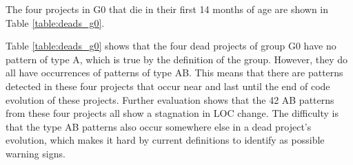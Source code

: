 \noindent
The four projects in G0 that die in their first 14 months of age are shown in
Table \ref{table:deads_g0}.



\noindent
Table \ref{table:deads_g0} shows that the four dead projects of group G0 have
no pattern of type A, which is true by the definition of the group. However,
they do all have occurrences of patterns of type AB. This means that there are
patterns detected in these four projects that occur near and last until the end
of code evolution of these projects. Further evaluation shows that the 42 AB
patterns from these four projects all show a stagnation in LOC change. The
difficulty is that the type AB patterns also occur somewhere else in a dead
project's evolution, which makes it hard by current definitions to identify as
possible warning signs.

\begin{comment}
More about:
- How come G1 have higher survival chances in the first year?
- How come G1 and G0 have equal chances between 3.2 and 3.8 years?
- What are the causes of death in G1? Especially the partial extinction in month
120?
- What is time-to-live between diagnosis and death?
- False-positives: patterns detected as warning signs which are not.
- False-negatives: warning signs undetected.
\end{comment}

\begin{comment}
- Analyse results
- Conclude and interpret results
- Answer hypotheses and research questions
- Threats to validity
- Discussion
- Future work
 
This chapter contains the analysis and interpretation of the results. The
research questions are answered as best as possible given the results that were
obtained. The analysis also discussed parts of the questions that were left
unanswered.

An important topic is the validity of the results.
What methods of validation were used?
Could the results be generalized to other cases?
What threats to validity can be identified?

There is room here to discuss the results of related scientific literature here
as well.
How do the results obtained here relate to other work, and what consequences are
there?
Did your approach work better or worse?
Did you learn anything new compared to the already existing body of knowledge?
Finally, what could you say in hindsight on the research approach by followed?
What could have done better?
What lessons have been learned?
What could other researchers use from your experience?

A separate section should be devoted to ‘future work,’ i.e., possible extension
points of your work that you have identified. Other researchers (or yourself)
could use those as a starting point.

Refer to Chapters 3.7 and 4 in this example thesis at Paul’s
homepage\footnote{http://homepages.cwi.nl/~paulk/thesesMasterSoftwareEngineering/2006/ReneWiegers.pdf}.
\end{comment}
